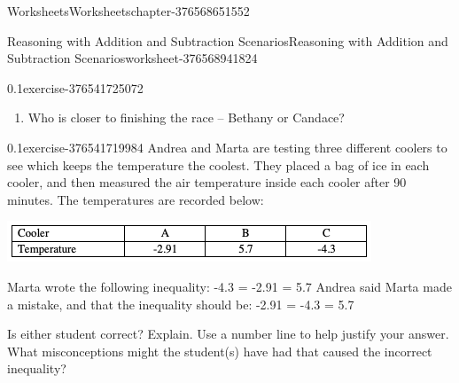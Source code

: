 \documentclass[twoside,11pt,]{book}
\begin{document}
\begin{chapterptx}{Worksheets}{}{Worksheets}{}{}{chapter-376568651552}
\begin{worksheet-section-numberless}{Reasoning with Addition and Subtraction Scenarios}{}{Reasoning with Addition and Subtraction Scenarios}{}{}{worksheet-376568941824}
\begin{divisionexercise}{5}{}{0.1}{exercise-376541725072}
\begin{enumerate}[label=(\alph*)]
\item\hypertarget{li-376541720752}{}Who is closer to finishing the race – Bethany or Candace?%
\end{enumerate}
\end{divisionexercise}%
\begin{divisionexercise}{6}{}{0.1}{exercise-376541719984}%
\hypertarget{p-376541719248}{}%
Andrea and Marta are testing three different coolers to see which keeps the temperature the coolest.  They placed a bag of ice in each cooler, and then measured the air temperature inside each cooler after 90 minutes.  The temperatures are recorded below:%
\begin{image}{0}{1}{0}%
\includegraphics[width=1\linewidth]{images/reasoning-table-cooler.png}
\end{image}%
\hypertarget{p-376541718112}{}%
Marta wrote the following inequality: -4.3 = -2.91 = 5.7 Andrea said Marta made a mistake, and that the inequality should be: -2.91 = -4.3 = 5.7%
\par
\hypertarget{p-376541717552}{}%
Is either student correct?  Explain.  Use a number line to help justify your answer.  What misconceptions might the student(s) have had that caused the incorrect inequality?%
\end{divisionexercise}%
\end{worksheet-section-numberless}
\restoregeometry
\end{chapterptx}
\end{document}
